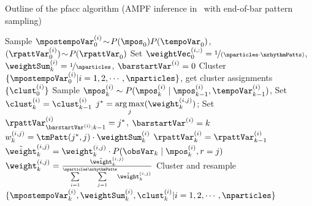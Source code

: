 \begin{algorithm}
  \caption{Outline of the \acrshort{pfacc} algorithm (\gls{AMPF} inference in \bpmodel\ with end-of-bar pattern sampling)}\label{algo:pf:acc}
  \begin{algorithmic}[1]
         \State Sample $\mpostempoVar^{(i)}_0 \!\sim\! P(\mpos _0)P(\tempoVar_0)$, $(\rpattVar_0^{(i)}) \!\sim\! P(\rpattVar_0)$ 
         \State Set $\weightVec_{0}^{(i,:)} = \nicefrac{1}{(\nparticles \cdot \nrhythmPatts)}$, $\weightSum_k^{(i)} = \nicefrac{1}{\nparticles}$, $\barstartVar^{(i)} = 0$
      \EndFor
      \State Cluster $\{\mpostempoVar^{(i)}_0 | i = 1, 2, \cdots, \nparticles\}$, get cluster assignments $\{\clust^{(i)}_0\}$
          
            \State Sample $\mpos^{(i)}_{k} \sim P(\mpos^{(i)}_{k} \mid \mpos^{(i)}_{k-1}, \tempoVar^{(i)}_{k-1})$, Set $\clust^{(i)}_k = \clust^{(i)}_{k-1}$
                
               \State $j^{*} = \argmax\limits_j(\weight_{k}^{(i,j)})$; Set $\rpattVar^{(i)}_{\barstartVar^{(i)}:k-1} = j^{*}$, $\barstartVar^{(i)} = k$
                  \State $w_k^{(i,j)} = \tmPatt(j^{*},j) \cdot \weightSum_k^{(i)}$    
               \EndFor
            \Else
               \State $\rpattVar_k^{(i)} = \rpattVar_{k-1}^{(i)}$  %
            \EndIf           
               \State $\tilde{\weight}_{k}^{(i,j)} = \weight_{k}^{(i,j)} \cdot P(\obsVar_{k} \mid \mpos_{k}^{(i)},r = j)$
            \EndFor
         \EndFor
          
               \State $\weight_{k}^{(i,j)}=\frac{\tilde{\weight}_{k}^{(i,j)}}{\overset{\nparticles}{\underset{i=1}{\sum}}\overset{\nrhythmPatts}{\underset{j=1}{\sum}}\tilde{\weight}_{k}^{(i,j)}}$
             \EndFor
         \EndFor
         	
            \State Cluster and resample $\{\mpostempoVar_k^{(i)}, \weightSum_{k}^{(i)}, \clust_k^{(i)} | i = 1, 2, \cdots, \nparticles\}$ \par

\end{algorithmic}
\end{algorithm}
